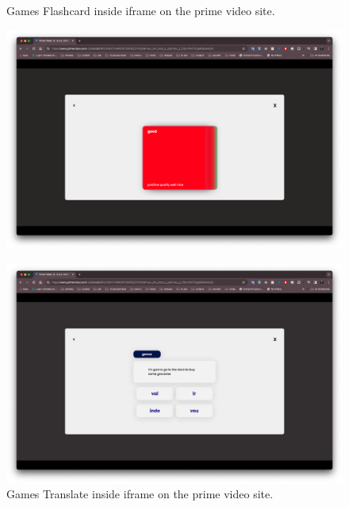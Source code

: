 \documentclass[12pt]{article}
\begin{document}
    \begin{frame}{}
      \begin{figure}[!h]
          \begin{minipage}[b]{0.5\linewidth}
            \centering
            \caption{
            Games Flashcard inside iframe on the prime video site.
            }
            \label{fig:iframe2}
            \includegraphics[width=1\textwidth]{assets/10.png}
          \end{minipage}
          \hspace{0.2cm}
          \begin{minipage}[b]{0.5\linewidth}
   
  
            \centering
            \caption{
            Games Translate inside iframe on the prime video site.
            }
            \label{fig:iframe4}
            \includegraphics[width=1\textwidth]{assets/12.png}
          \end{minipage}
      \end{figure}
    \end{frame}
\end{document}
